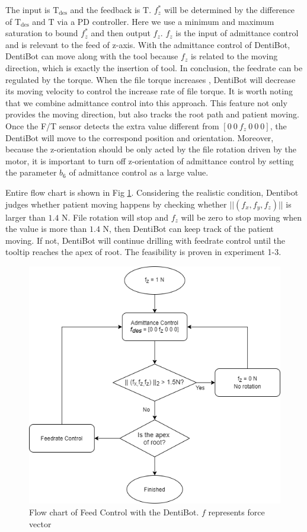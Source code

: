 The input is $\mathrm{T_{des}}$ and the feedback is $\mathrm{T}$. $f^*_z$ will be determined by the difference of $\mathrm{T_{des}}$ and $\mathrm{T}$ via a PD controller. Here we use a minimum and maximum saturation to bound $f^*_z$ and then output $f_z$. $f_z$ is the input of admittance control and is relevant to  the feed of z-axis. With the admittance control of DentiBot, DentiBot can move along with the tool because $f_z$ is related to the moving direction, which is exactly the insertion of tool. In conclusion, the feedrate can be regulated by the torque. When the file torque increases , DentiBot will decrease its moving velocity to control the increase rate of file torque.  It is worth noting that we combine admittance control into this approach. This feature not only provides the moving direction, but also tracks the root path and patient moving. Once the F/T sensor detects the extra value different from $[0\ 0\ f_z\ 0\ 0\ 0]$, the DentiBot will move to the correspond position and orientation. Moreover, because the z-orientation should be only acted by the file rotation driven by the motor, it is important to turn off z-orientation of admittance control by setting the parameter $b_6$ of admittance control as a large value.
\par
Entire flow chart is shown in Fig \ref{fig: feed_control2}. Considering the realistic condition, Dentibot judges whether patient moving happens by checking whether $||(f_x,f_y,f_z)||$ is larger than $1.4$ N. File rotation will stop and $f_z$ will be zero to stop moving when the value is more than $1.4$ N, then DentiBot can keep track of the patient moving. If not, DentiBot will continue drilling with feedrate control until the tooltip reaches the apex of root. The feasibility is proven in experiment 1-3.
\begin{figure}[htbp]
\begin{center}
\includegraphics[width=0.7\linewidth]{Images/torque_control.png}
\caption{Flow chart of Feed Control with the DentiBot. $f$ represents force vector}
\label{fig: feed_control2}
\end{center}
\end{figure}
